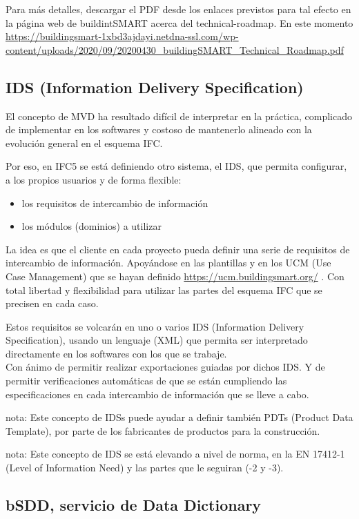\documentclass[spanish,10pt,a4paper,final,oneside]{article}
\begin{document}
{\tiny Para más detalles, descargar el PDF desde los enlaces previstos para tal efecto en la página web de buildintSMART acerca del technical-roadmap. En este momento \url{https://buildingsmart-1xbd3ajdayi.netdna-ssl.com/wp-content/uploads/2020/09/20200430_buildingSMART_Technical_Roadmap.pdf}}



\subsection{IDS (Information Delivery Specification)}

El concepto de MVD ha resultado difícil de interpretar en la práctica, complicado de implementar en los softwares y costoso de mantenerlo alineado con la evolución general en el esquema IFC.

Por eso, en IFC5 se está definiendo otro sistema, el IDS, que permita configurar, a los propios usuarios y de forma flexible:
\begin{itemize}
\item los requisitos de intercambio de información
\item los módulos (dominios) a utilizar
\end{itemize}
La idea es que el cliente en cada proyecto pueda definir una serie de requisitos de intercambio de información. Apoyándose en las plantillas y en los UCM (Use Case Management) que se hayan definido \url{https://ucm.buildingsmart.org/} . Con total libertad y flexibilidad para utilizar las partes del esquema IFC que se precisen en cada caso.

Estos requisitos se volcarán en uno o varios IDS (Information Delivery Specification), usando un lenguaje {\footnotesize (XML)} que permita ser interpretado directamente en los softwares con los que se trabaje.
\\Con ánimo de permitir realizar exportaciones guiadas por dichos IDS. Y de permitir verificaciones automáticas de que se están cumpliendo las especificaciones en cada intercambio de información que se lleve a cabo.

nota: Este concepto de IDSs puede ayudar  a definir también PDTs (Product Data Template), por parte de los fabricantes de productos para la construcción.

nota: Este concepto de IDS se está elevando a nivel de norma, en la EN 17412-1 (Level of Information Need) y las partes que le seguiran (-2 y -3).

\subsection{bSDD, servicio de Data Dictionary}
\end{document}
